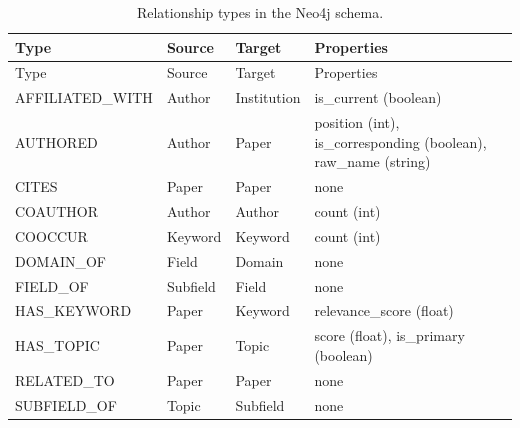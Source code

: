\begin{longtable}{p{3cm}p{2.5cm}p{2.5cm}p{5cm}}
\caption{Relationship types in the Neo4j schema.}
\label{tab:relationships} \\

\toprule
Type & Source & Target & {\raggedright Properties\par} \\
\midrule
\endfirsthead

\toprule
Type & Source & Target & {\raggedright Properties\par} \\
\midrule
\endhead

\bottomrule
\endfoot

AFFILIATED\_WITH & Author & Institution & {\raggedright is\_current (boolean)\par} \\
AUTHORED & Author & Paper & {\raggedright position (int), is\_corresponding (boolean), raw\_name (string)\par} \\
CITES & Paper & Paper & none \\
COAUTHOR & Author & Author & count (int) \\
COOCCUR & Keyword & Keyword & count (int) \\
DOMAIN\_OF & Field & Domain & none \\
FIELD\_OF & Subfield & Field & none \\
HAS\_KEYWORD & Paper & Keyword & {\raggedright relevance\_score (float)\par} \\
HAS\_TOPIC & Paper & Topic & {\raggedright score (float), is\_primary (boolean)\par} \\
RELATED\_TO & Paper & Paper & none \\
SUBFIELD\_OF & Topic & Subfield & none \\

\end{longtable}


